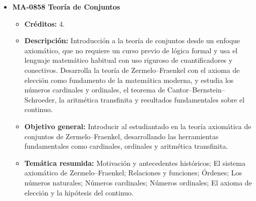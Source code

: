 \begin{itemize}[leftmargin=1.3em, itemsep=10pt, topsep=4pt, label={\color{Azul-UCR}$\blacksquare$}]
\item {\color{Azul-UCR}\textbf{MA-0858 Teoría de Conjuntos}}\par\nopagebreak\smallskip
\begin{itemize}[leftmargin=1.1em, itemsep=3pt, topsep=2pt, parsep=2pt, label={\textendash}]
\item \textbf{Créditos:} 4.
\item \textbf{Descripción:} Introducción a la teoría de conjuntos desde un enfoque axiomático, que no requiere un curso previo de lógica formal y usa el lenguaje matemático habitual con uso riguroso de cuantificadores y conectivos. Desarrolla la teoría de Zermelo--Fraenkel con el axioma de elección como fundamento de la matemática moderna, y estudia los números cardinales y ordinales, el teorema de Cantor--Bernstein--Schroeder, la aritmética transfinita y resultados fundamentales sobre el continuo.
\item \textbf{Objetivo general:} Introducir al estudiantado en la teoría axiomática de conjuntos de Zermelo--Fraenkel, desarrollando las herramientas fundamentales como cardinales, ordinales y aritmética transfinita.
\item \textbf{Temática resumida:} Motivación y antecedentes históricos; El sistema axiomático de Zermelo--Fraenkel; Relaciones y funciones; Órdenes; Los números naturales; Números cardinales; Números ordinales; El axioma de elección y la hipótesis del continuo.
\end{itemize}


\end{itemize}
